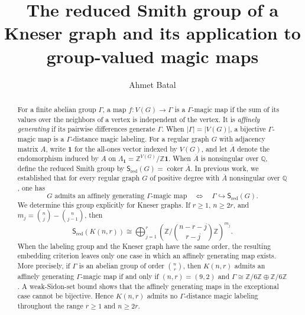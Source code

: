 \documentclass[11pt,reqno]{amsart}
\theoremstyle{plain}
\theoremstyle{definition}
\theoremstyle{remark}
\newcommand{\Sred}{\mathsf S_{\mathrm{red}}}
\newcommand{\Lamone}{\Lambda_{\mathbf1}}
\begin{document}
\title[The reduced Smith group of a Kneser graph]
{The reduced Smith group of a Kneser graph and its application to group-valued magic maps}

\author{Ahmet Batal}
\address{Department of Mathematics, Izmir Institute of Technology, 35430, Urla, Izmir, Turkey}


\begin{abstract}
For a finite abelian group $\Gamma$, a map $f\colon V(G)\to\Gamma$ is a
$\Gamma$-magic map if the sum of its values over the neighbors of a vertex is
independent of the vertex. It is \emph{affinely generating} if its pairwise
differences generate $\Gamma$. When $|\Gamma|=|V(G)|$, a bijective
$\Gamma$-magic map is a $\Gamma$-distance magic labeling.
For a regular graph $G$ with adjacency matrix $A$, write $\mathbf1$ for the
all-ones vector indexed by $V(G)$, and let $\overline A$ denote the
endomorphism induced by $A$ on
$\Lamone=\mathbb Z^{V(G)}/\mathbb Z\mathbf1$. When $\overline A$ is
nonsingular over $\mathbb Q$, define the reduced Smith group by
$\Sred(G)=\operatorname{coker}\overline A$.
In previous work, we established that for every regular graph $G$ of positive
degree with $\overline A$ nonsingular over $\mathbb Q$, one has
\[
  G\text{ admits an affinely generating }\Gamma\text{-magic map}
  \quad\Longleftrightarrow\quad
  \Gamma\hookrightarrow\Sred(G).
\]
We determine this group explicitly for Kneser graphs. If $r\ge1$, $n\ge2r$, and
$m_j=\binom nj-\binom n{j-1}$, then
\[
  \Sred(K(n,r))\cong
  \bigoplus_{j=1}^{r}
  \left(\mathbb Z/\binom{n-r-j}{r-j}\mathbb Z\right)^{m_j}.
\]
When the labeling group and the Kneser graph have the same order, the
resulting embedding criterion leaves only one case in which an affinely
generating map exists. More precisely, if $\Gamma$ is an abelian group of
order $\binom nr$, then $K(n,r)$ admits an affinely generating
$\Gamma$-magic map if and only if
 $(n,r)=(9,2)$
and
$\Gamma\cong\mathbb Z/6\mathbb Z\oplus\mathbb Z/6\mathbb Z$.
A weak-Sidon-set bound shows that the affinely generating maps in the
exceptional case cannot be bijective.
Hence $K(n,r)$ admits no $\Gamma$-distance magic labeling throughout the
range $r\ge1$ and $n\ge2r$.
\end{abstract}
\end{document}
